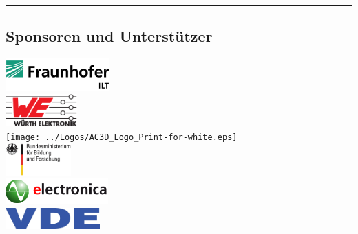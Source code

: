 \documentclass[a4paper,12pt,notumble]{leaflet}
\begin{document}
\textcolor{rwth-lblue}{\noindent\rule{\textwidth}{4pt}}

\noindent
\begin{minipage}[c][0.45\textheight][t]{\textwidth}
	\begin{center}
		\section{Sponsoren und Unterstützer}
		\vspace{0.7cm}
		\includegraphics[height=1.25cm]{../Logos/Fraunhofer_ILT_klein.png} \\ \vspace{0.3cm}
		\includegraphics[height=1.25cm]{../Logos/Wuerth.png} \\ \vspace{0.3cm}
		\texttt{[image: ../Logos/AC3D\_Logo\_Print-for-white.eps]} \\ \vspace{0.3cm}
		\includegraphics[height=1.25cm]{../Logos/BMBF.png} \\ \vspace{0.3cm}
		\includegraphics[height=1cm]{../Logos/electronica.png} \\ \vspace{0.3cm}
		\includegraphics[height=0.8cm]{../Logos/VDE.png}
	\end{center}
\end{minipage}
\end{document}
